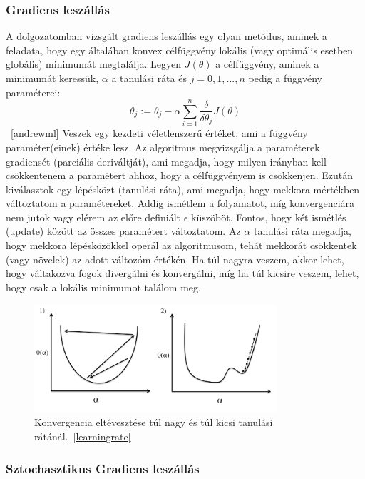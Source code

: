 \documentclass[a4paper,12pt]{article}
\begin{document}
\subsubsection{Gradiens leszállás}

A dolgozatomban vizsgált gradiens leszállás egy olyan metódus, aminek a feladata, hogy egy általában konvex célfüggvény lokális (vagy optimális esetben globális) minimumát megtalálja. Legyen $J(\theta)$ a célfüggvény, aminek a minimumát keressük, $\alpha$ a tanulási ráta és $j=0, 1, ..., n$ pedig a függvény paraméterei:
\[\theta_j:=\theta_j-\alpha\sum\limits_{i=1}^n\frac{\delta}{\delta\theta_j}J(\theta)\]~\ref{andrewml}
Veszek egy kezdeti véletlenszerű értéket, ami a függvény paraméter(einek) értéke lesz. Az algoritmus megvizsgálja a paraméterek gradiensét (parciális deriváltját), ami megadja, hogy milyen irányban kell csökkentenem a paramétert ahhoz, hogy a célfüggvényem is csökkenjen. Ezután kiválasztok egy lépésközt (tanulási ráta), ami megadja, hogy mekkora mértékben változtatom a paramétereket. Addig ismétlem a folyamatot, míg konvergenciára nem jutok vagy elérem az előre definiált $\epsilon$ küszöböt. Fontos, hogy két ismétlés (update) között az összes paramétert változtatom. \linebreak
Az $\alpha$ tanulási ráta megadja, hogy mekkora lépésközökkel operál az algoritmusom, tehát mekkorát csökkentek (vagy növelek) az adott változóm értékén. Ha túl nagyra veszem, akkor lehet, hogy váltakozva fogok divergálni és konvergálni, míg ha túl kicsire veszem, lehet, hogy csak a lokális minimumot találom meg.

\begin{figure}[ht!]
\centering
\includegraphics[width=90mm]{img/alfa.png}
\caption{Konvergencia eltévesztése túl nagy és túl kicsi tanulási rátánál.~\ref{learningrate} \label{alfa}}
\end{figure}

\subsubsection{Sztochasztikus Gradiens leszállás}
\end{document}
